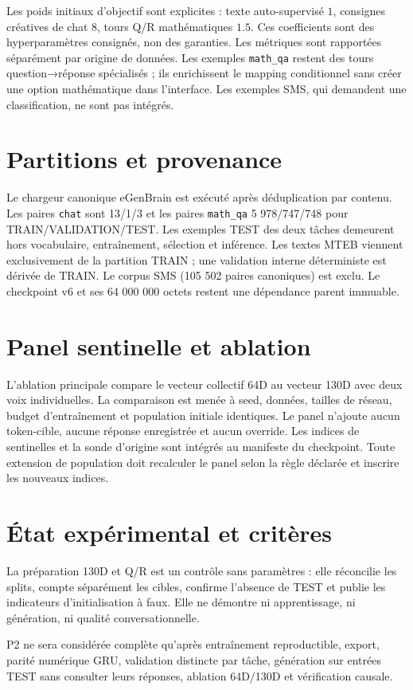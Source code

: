 \documentclass[11pt,a4paper]{report}
\begin{document}
Les poids initiaux d'objectif sont explicites : texte auto-supervisé $1$, consignes créatives de chat $8$, tours Q/R mathématiques $1.5$. Ces coefficients sont des hyperparamètres consignés, non des garanties. Les métriques sont rapportées séparément par origine de données. Les exemples \texttt{math\_qa} restent des tours question→réponse spécialisés ; ils enrichissent le mapping conditionnel sans créer une option mathématique dans l'interface. Les exemples SMS, qui demandent une classification, ne sont pas intégrés.

\section{Partitions et provenance}
Le chargeur canonique eGenBrain est exécuté après déduplication par contenu. Les paires \texttt{chat} sont 13/1/3 et les paires \texttt{math\_qa} 5 978/747/748 pour TRAIN/VALIDATION/TEST. Les exemples TEST des deux tâches demeurent hors vocabulaire, entraînement, sélection et inférence. Les textes MTEB viennent exclusivement de la partition TRAIN ; une validation interne déterministe est dérivée de TRAIN. Le corpus SMS (105 502 paires canoniques) est exclu. Le checkpoint v6 et ses 64 000 000 octets restent une dépendance parent immuable.

\section{Panel sentinelle et ablation}
L'ablation principale compare le vecteur collectif 64D au vecteur 130D avec deux voix individuelles. La comparaison est menée à seed, données, tailles de réseau, budget d'entraînement et population initiale identiques. Le panel n'ajoute aucun token-cible, aucune réponse enregistrée et aucun override. Les indices de sentinelles et la sonde d'origine sont intégrés au manifeste du checkpoint. Toute extension de population doit recalculer le panel selon la règle déclarée et inscrire les nouveaux indices.

\section{État expérimental et critères}
La préparation 130D et Q/R est un contrôle sans paramètres : elle réconcilie les splits, compte séparément les cibles, confirme l'absence de TEST et publie les indicateurs d'initialisation à faux. Elle ne démontre ni apprentissage, ni génération, ni qualité conversationnelle.\par
P2 ne sera considérée complète qu'après entraînement reproductible, export, parité numérique GRU, validation distincte par tâche, génération sur entrées TEST sans consulter leurs réponses, ablation 64D/130D et vérification causale.
\end{document}

